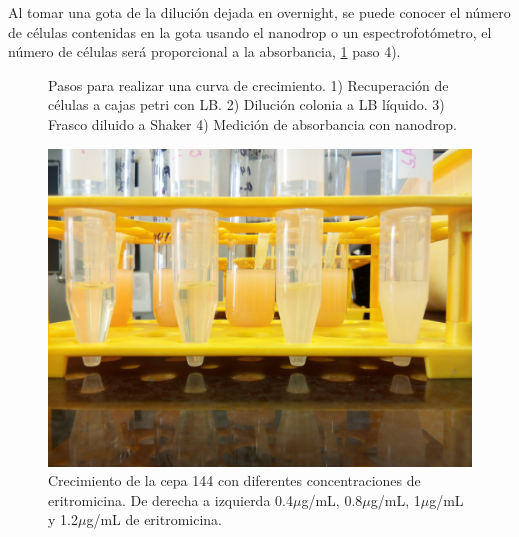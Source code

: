 \documentclass[%
 reprint,
 amsmath,amssymb,
 aps,
]{revtex4-2}
\begin{document}
 Al tomar una gota de la diluci\'{o}n dejada en overnight, se puede conocer el n\'{u}mero de c\'{e}lulas contenidas en la gota usando el nanodrop o un espectrofot\'{o}metro, el n\'{u}mero de c\'{e}lulas ser\'{a} proporcional a la absorbancia, \ref{fig:curv1} paso 4).\\
\begin{figure}
 
  
  \caption{Pasos para realizar una curva de crecimiento. 1) Recuperaci\'{o}n de c\'{e}lulas a cajas petri con LB. 2) Diluci\'{o}n colonia a LB l\'{i}quido. 3) Frasco diluido a Shaker 4) Medici\'{o}n de absorbancia con nanodrop. }
  \label{fig:curv1}
\end{figure}
\begin{figure}[h]
\includegraphics[scale=0.04]{./Imagenes/144_eri.jpg}
  \caption{Crecimiento de la cepa 144 con diferentes concentraciones de  eritromicina. De derecha a izquierda 0.4$\mu$g/mL, 0.8$\mu$g/mL, 1$\mu$g/mL y 1.2$\mu$g/mL de  eritromicina.}
  \label{fig:144_eri}
\end{figure}
\end{document}
